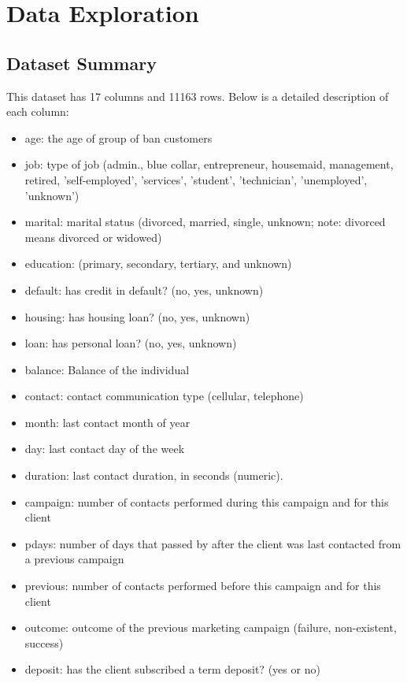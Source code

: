 \documentclass[12pt]{article}
\begin{document}
\section{Data Exploration}
\subsection{Dataset Summary}
This dataset has 17 columns and 11163 rows. Below is a detailed description of each column: 

\begin{itemize}

\item age: the age of group of ban customers
\item	job: type of job (admin., blue collar, entrepreneur, housemaid, management, retired, 'self-employed', 'services', 'student', 'technician', 'unemployed', 'unknown')
\item	marital: marital status (divorced, married, single, unknown; note: divorced means divorced or widowed)
\item	education: (primary, secondary, tertiary, and unknown)
\item	default: has credit in default? (no, yes, unknown)
\item	housing: has housing loan? (no, yes, unknown)
\item	loan: has personal loan? (no, yes, unknown)
\item	balance: Balance of the individual
\item	contact: contact communication type (cellular, telephone)
\item	month: last contact month of year 
\item	day: last contact day of the week 
\item	duration: last contact duration, in seconds (numeric). 
\item	campaign: number of contacts performed during this campaign and for this client 
\item pdays: number of days that passed by after the client was last contacted from a previous campaign 
\item	previous: number of contacts performed before this campaign and for this client 
\item outcome: outcome of the previous marketing campaign (failure, non-existent, success)
\item	deposit: has the client subscribed a term deposit? (yes or no)
\end{itemize}
\end{document}
